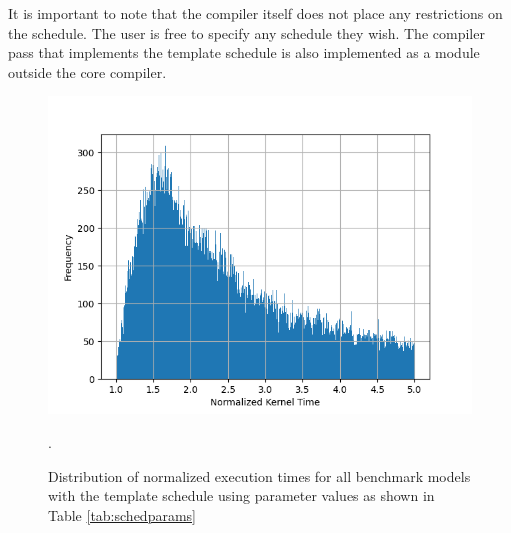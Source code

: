 \begin{table}[htb]
  \centering
  \vskip 5pt
  \caption{\label{tab:schedparams} List of parameter values we explored for the template GPU schedule.}
\end{table}

It is important to note that the \Treebeard{} compiler itself does not place any 
restrictions on the schedule. The user is free to specify any schedule they wish.
The compiler pass that implements the template schedule is also implemented as a 
module outside the core \Treebeard{} compiler. 

\begin{figure}[htb]
  \centering
  \includegraphics[width=\linewidth]{figures/normalized_kernel_histogram_lt5.png}
  \caption{Distribution of normalized execution times for all benchmark models
  with the template schedule using parameter values as shown in Table \ref{tab:schedparams}}. 
  \label{Fig:ExecTimeDistribution}
\end{figure}

